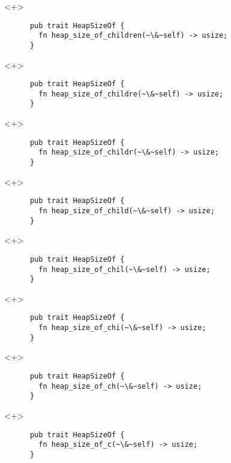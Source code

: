 \documentclass[usepdftitle=false]{beamer}
\renewcommand{\&}{\makebox[\widthof{\ampersand}][c]{\scalebox{0.9}[1.0]{\Book\ampersand}}}
\newcommand{\+}{\makebox[\widthof{+}][c]{\raisebox{-.2\height}{\scalefont{1.5}\Light+}}}
\begin{document}
\begin{frame}[fragile]
  \begin{onlyenv}<+>
    \begin{verbatim}
      pub trait HeapSizeOf {
        fn heap_size_of_children(~\&~self) -> usize;
      }
    \end{verbatim}
  \end{onlyenv}
  \begin{onlyenv}<+>
    \begin{verbatim}
      pub trait HeapSizeOf {
        fn heap_size_of_childre(~\&~self) -> usize;
      }
    \end{verbatim}
  \end{onlyenv}
  \begin{onlyenv}<+>
    \begin{verbatim}
      pub trait HeapSizeOf {
        fn heap_size_of_childr(~\&~self) -> usize;
      }
    \end{verbatim}
  \end{onlyenv}
  \begin{onlyenv}<+>
    \begin{verbatim}
      pub trait HeapSizeOf {
        fn heap_size_of_child(~\&~self) -> usize;
      }
    \end{verbatim}
  \end{onlyenv}
  \begin{onlyenv}<+>
    \begin{verbatim}
      pub trait HeapSizeOf {
        fn heap_size_of_chil(~\&~self) -> usize;
      }
    \end{verbatim}
  \end{onlyenv}
  \begin{onlyenv}<+>
    \begin{verbatim}
      pub trait HeapSizeOf {
        fn heap_size_of_chi(~\&~self) -> usize;
      }
    \end{verbatim}
  \end{onlyenv}
  \begin{onlyenv}<+>
    \begin{verbatim}
      pub trait HeapSizeOf {
        fn heap_size_of_ch(~\&~self) -> usize;
      }
    \end{verbatim}
  \end{onlyenv}
  \begin{onlyenv}<+>
    \begin{verbatim}
      pub trait HeapSizeOf {
        fn heap_size_of_c(~\&~self) -> usize;
      }
    \end{verbatim}

\end{onlyenv}
\end{frame}
\end{document}
